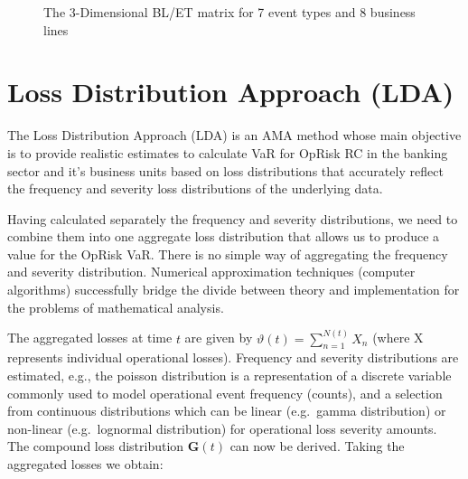 \documentclass[]{article}
\begin{document}
\begin{figure}
\label{BL/ET Matrix}
\caption{The 3-Dimensional BL/ET matrix for 7 event types and 8 business lines}
\end{figure}

\section{Loss Distribution Approach (LDA)}

The Loss Distribution Approach (LDA) is an AMA method whose main
objective is to provide realistic estimates to calculate VaR for OpRisk
RC in the banking sector and it's business units based on loss
distributions that accurately reflect the frequency and severity loss
distributions of the underlying data.\medskip

Having calculated separately the frequency and severity distributions,
we need to combine them into one aggregate loss distribution that allows
us to produce a value for the OpRisk VaR. There is no simple way of
aggregating the frequency and severity distribution. Numerical
approximation techniques (computer algorithms) successfully bridge the
divide between theory and implementation for the problems of
mathematical analysis. \medskip

The aggregated losses at time \(t\) are given by
\(\vartheta(t) = \sum_{n=1}^{N(t)} X_{n}\) (where X represents
individual operational losses). Frequency and severity distributions are
estimated, e.g., the poisson distribution is a representation of a
discrete variable commonly used to model operational event frequency
(counts), and a selection from continuous distributions which can be
linear (e.g.~gamma distribution) or non-linear (e.g.~lognormal
distribution) for operational loss severity amounts. The compound loss
distribution \(\mathbf{G}(t)\) can now be derived. Taking the aggregated
losses we obtain:
\end{document}
